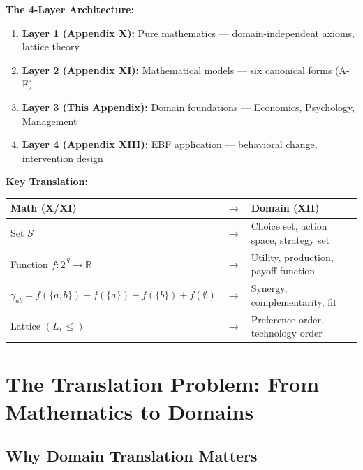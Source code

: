 \begin{tcolorbox}[colback=blue!5!white,colframe=blue!75!black,title=\textbf{Quick Reference: Layer 3 Position}]
\textbf{The 4-Layer Architecture:}
\begin{enumerate}[noitemsep]
    \item \textbf{Layer 1 (Appendix X):} Pure mathematics — domain-independent axioms, lattice theory
    \item \textbf{Layer 2 (Appendix XI):} Mathematical models — six canonical forms (A-F)
    \item \textbf{Layer 3 (This Appendix):} Domain foundations — Economics, Psychology, Management
    \item \textbf{Layer 4 (Appendix XIII):} EBF application — behavioral change, intervention design
\end{enumerate}

\textbf{Key Translation:}
\begin{center}
\begin{tabular}{lll}
\textbf{Math (X/XI)} & $\rightarrow$ & \textbf{Domain (XII)} \\
\hline
Set $S$ & $\rightarrow$ & Choice set, action space, strategy set \\
Function $f: 2^S \to \mathbb{R}$ & $\rightarrow$ & Utility, production, payoff function \\
$\gamma_{ab} = f(\{a,b\}) - f(\{a\}) - f(\{b\}) + f(\emptyset)$ & $\rightarrow$ & Synergy, complementarity, fit \\
Lattice $(L, \leq)$ & $\rightarrow$ & Preference order, technology order \\
\end{tabular}
\end{center}
\end{tcolorbox}

\section{The Translation Problem: From Mathematics to Domains}
\label{sec:translation}

\subsection{Why Domain Translation Matters}

